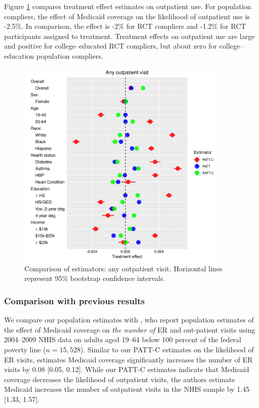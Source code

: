\documentclass[hidelinks,12pt]{article}
\begin{document}
Figure \ref{fig:any-out-plot} compares treatment effect estimates on outpatient use. For population compliers, the effect of Medicaid coverage on the likelihood of outpatient use is -2.5\%. In comparison, the effect is -2\% for RCT compliers and -1.2\% for RCT participants assigned to treatment. Treatment effects on outpatient use are large and positive for college--educated RCT compliers, but about zero for college--education population compliers. 
%

\begin{figure}[htbp]
\begin{center}
\includegraphics[width = 0.9\textwidth]{any-out-plot}
    \caption{Comparison of estimators: any outpatient visit. Horizontal lines represent 95\% bootstrap confidence intervals.\label{fig:any-out-plot}}
\end{center}
\end{figure}

{\color{red}
\subsubsection{Comparison with previous results} \label{results-compare}
}
We compare our population estimates with \citet{finkelstein2012}, who report population estimates of the effect of Medicaid coverage on \emph{the number of} ER and out-patient visits using 2004--2009 NHIS data on adults aged 19--64 below 100 percent of the federal poverty line ($n=15,528$). Similar to our PATT-C estimates on the likelihood of ER visits, \citet{finkelstein2012} estimates Medicaid coverage significantly increases the number of ER visits by 0.08 [0.05, 0.12]. While our PATT-C estimates indicate that Medicaid coverage decreases the likelihood of outpatient visits, the authors estimate Medicaid increases the number of outpatient visits in the NHIS sample by 1.45 [1.33, 1.57]. 
\end{document}
